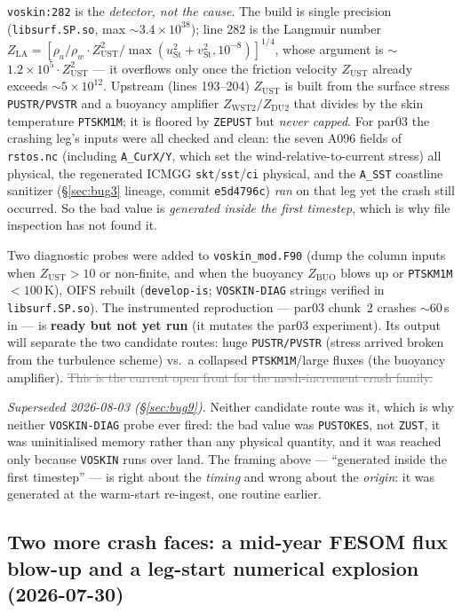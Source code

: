 \documentclass[11pt,a4paper]{article}
\newcommand{\code}[1]{\texttt{\small #1}}
\newcommand{\dead}[1]{\textcolor{gray}{\sout{#1}}}
\begin{document}
\code{voskin:282} is the \emph{detector, not the cause}. The build is single precision
(\code{libsurf.SP.so}, max $\sim$$3.4\times10^{38}$); line 282 is the Langmuir number
$Z_\mathrm{LA}=[\rho_a/\rho_w\cdot Z_\mathrm{UST}^2 / \max(u_\mathrm{St}^2{+}v_\mathrm{St}^2,10^{-8})]^{1/4}$,
whose argument is $\sim$$1.2\times10^5\cdot Z_\mathrm{UST}^2$ --- it overflows only once the friction
velocity $Z_\mathrm{UST}$ already exceeds $\sim$$5\times10^{12}$. Upstream (lines 193--204)
$Z_\mathrm{UST}$ is built from the surface stress \code{PUSTR/PVSTR} and a buoyancy amplifier
$Z_\mathrm{WST2}/Z_\mathrm{DU2}$ that divides by the skin temperature \code{PTSKM1M}; it is floored
by \code{ZEPUST} but \emph{never capped}. For par03 the crashing leg's inputs were all checked and
clean: the seven A096 fields of \code{rstos.nc} (including \code{A\_CurX/Y}, which set the
wind-relative-to-current stress) all physical, the regenerated ICMGG \code{skt}/\code{sst}/\code{ci}
physical, and the \code{A\_SST} coastline sanitizer (\S\ref{sec:bug3} lineage, commit
\code{e5d4796c}) \emph{ran} on that leg yet the crash still occurred. So the bad value is
\emph{generated inside the first timestep}, which is why file inspection has not found it.

Two diagnostic probes were added to \code{voskin\_mod.F90} (dump the column inputs when
$Z_\mathrm{UST}>10$ or non-finite, and when the buoyancy $Z_\mathrm{BUO}$ blows up or
\code{PTSKM1M}$<100$\,K), OIFS rebuilt (\code{develop-is}; \code{VOSKIN-DIAG} strings verified in
\code{libsurf.SP.so}). The instrumented reproduction --- par03 chunk~2 crashes $\sim$60\,s in ---
is \textbf{ready but not yet run} (it mutates the par03 experiment). Its output will separate the
two candidate routes: huge \code{PUSTR/PVSTR} (stress arrived broken from the turbulence scheme)
vs.\ a collapsed \code{PTSKM1M}/large fluxes (the buoyancy amplifier). \dead{This is the current
open front for the mesh-increment crash family.}

\emph{Superseded 2026-08-03 (\S\ref{sec:bug9}).} Neither candidate route was it, which is why neither
\code{VOSKIN-DIAG} probe ever fired: the bad value was \code{PUSTOKES}, not \code{ZUST}, it was
uninitialised memory rather than any physical quantity, and it was reached only because \code{VOSKIN}
runs over land. The framing above --- ``generated inside the first timestep'' --- is right about the
\emph{timing} and wrong about the \emph{origin}: it was generated at the warm-start re-ingest, one
routine earlier.

\subsection{Two more crash faces: a mid-year FESOM flux blow-up and a leg-start numerical explosion (2026-07-30)}\label{sec:2026-07-30}
\end{document}
